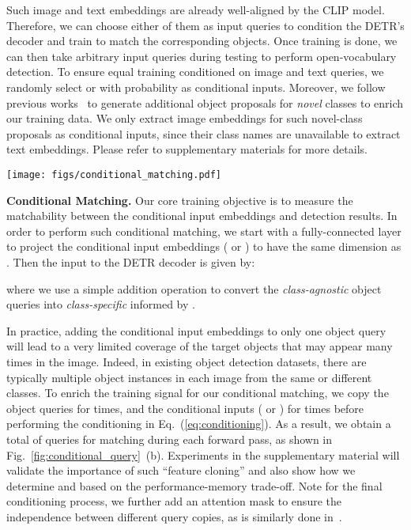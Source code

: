 \documentclass[runningheads]{llncs}
\begin{document}
Such image and text embeddings are already well-aligned by the CLIP model. Therefore, we can choose either of them as input queries to condition the DETR's decoder and train to match the corresponding objects. Once training is done, we can then take arbitrary input queries during testing to perform open-vocabulary detection. To ensure equal training conditioned on image and text queries, we randomly select  or  with probability 
as conditional inputs. Moreover, we follow previous works~\cite{gu2021open,xie2021zsd,du2022learning} to generate additional object proposals for \emph{novel} classes to enrich our training data. We only extract image embeddings  for such novel-class proposals as conditional inputs, since their class names are unavailable to extract text embeddings. Please refer to supplementary materials for more details.

\begin{figure*}[t]
\centering
\texttt{[image: figs/conditional\_matching.pdf]}
\caption{
DETR decoder with \textbf{(a)} single conditional input or \textbf{(b)} multiple conditional inputs in parallel.
}
\label{fig:conditional_query}
\end{figure*}
\noindent \textbf{Conditional Matching.} Our core training objective is to measure the matchability between the conditional input embeddings and detection results. In order to perform such conditional matching, we start with a fully-connected layer  to project the conditional input embeddings ( or ) to have the same dimension as . Then the input to the DETR decoder  is given by:

where we use a simple addition operation  to convert the \textit{class-agnostic} object queries  into \textit{class-specific}  informed by .


In practice, adding the conditional input embeddings  to only one object query will lead to a very limited coverage of the target objects that may appear many times in the image. Indeed, in existing object detection datasets, there are typically multiple object instances in each image from the same or different classes.
To enrich the training signal for our conditional matching, we copy the object queries  for  times, and the conditional inputs ( or ) for  times before performing the conditioning in Eq.~(\ref{eq:conditioning}). As a result, we obtain a total of  queries for matching during each forward pass, as shown in Fig.~\ref{fig:conditional_query}~(b). Experiments in the supplementary material will validate the importance of such ``feature cloning'' and also show how we determine  and  based on the performance-memory trade-off. Note for the final conditioning process, we further add an attention mask to ensure the independence between different query copies, as is similarly done in~\cite{dai2021up}.
\end{document}
